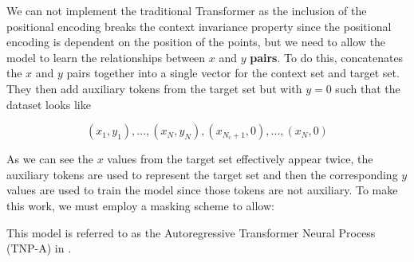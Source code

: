 \documentclass[../../main.tex]{subfiles}
\begin{document}
We can not implement the traditional Transformer as the inclusion of the positional encoding breaks the context invariance property since the positional encoding is dependent on the position of the points, but we need to allow the model to learn the relationships between $x$ and $y$ \textbf{pairs}. To do this, \cite{nguyen2023transformer} concatenates the $x$ and $y$ pairs together into a single vector for the context set and target set. They then add auxiliary tokens from the target set but with $y=0$ such that the dataset looks like

\[
	 {(x_1, y_1), . . . ,(x_N , y_N ),(x_{N_c+1}, 0), . . . ,(x_N , 0)}
\]

As we can see the $x$ values from the target set effectively appear twice, the auxiliary tokens are used to represent the target set and then the corresponding $y$ values are used to train the model since those tokens are not auxiliary. To make this work, we must employ a masking scheme to allow:


This model is referred to as the Autoregressive Transformer Neural Process (TNP-A) in \cite{nguyen2023transformer}.

\ifSubfilesClassLoaded{%
    \printbibliography{}
}{} 
\end{document}
